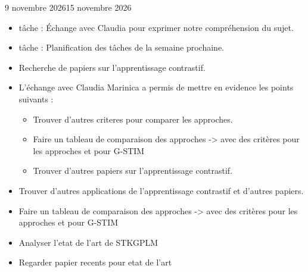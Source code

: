 \documentclass[12pt]{fiche-rd-info}
\begin{document}

\begin{fichesuivi}{9 novembre 2026}{15 novembre 2026}

	\begin{travaileffectue}
		\begin{itemize}
			\item tâche : Échange avec Claudia pour exprimer notre compréhension du sujet.
			\item tâche : Planification des tâches de la semaine prochaine.
		\end{itemize}
	\end{travaileffectue}

	\begin{travailnoneffectue}
		\begin{itemize}
			\item Recherche de papiers sur l'apprentissage contrastif.
		\end{itemize}
	\end{travailnoneffectue}

	\begin{echange}
		\begin{itemize}
			\item L'échange avec Claudia Marinica a permis de mettre en evidence les points suivants :
			\begin{itemize}
				\item Trouver d'autres criteres pour comparer les approches.
				\item Faire un tableau de comparaison des approches -> avec des critères pour les approches et pour G-STIM
				\item Trouver d'autres papiers sur l'apprentissage contrastif.
			\end{itemize}
		\end{itemize}
	\end{echange}

	\begin{planification}
		\begin{itemize}
			\item Trouver d'autres applications de l'apprentissage contrastif et d'autres papiers.
			\item Faire un tableau de comparaison des approches -> avec des critères pour les approches et pour G-STIM
			\item Analyser l'etat de l'art de STKGPLM
			\item Regarder papier recents pour etat de l'art
		\end{itemize}
	\end{planification}
\end{fichesuivi}
\end{document}
